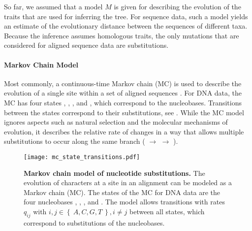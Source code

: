 So far, we assumed that a model $M$ is given for describing the evolution of the traits that are used for inferring the tree.
For sequence data, such a model yields an estimate of the evolutionary distance between the sequences of different taxa.
Because the inference assumes homologous traits,
the only mutations that are considered for aligned sequence data are substitutions.

\paragraph{Markov Chain Model}
\label{ch:Foundations:sec:MLTreeInference:sub:ModelsOfSeqEvol:par:MCModel}

Most commonly, a continuous-time Markov chain (MC) is used to describe
the evolution of a single site within a set of aligned sequences \cite{Gagniuc2017}.
For DNA data, the MC has four states , , , and ,
which correspond to the nucleobases.
Transitions between the states correspond to their substitutions, see .
While the MC model ignores aspects such as natural selection and the molecular mechanisms of evolution,
it describes the relative rate of changes in a way that allows multiple substitutions to occur
along the same branch ( $\rightarrow$  $\rightarrow$ ).

\begin{figure}[hpbt]
    \centering
    \texttt{[image: mc\_state\_transitions.pdf]}
    \caption[Markov chain model of nucleotide substitutions]{
        \textbf{Markov chain model of nucleotide substitutions.}
        The evolution of characters at a site in an alignment can be modeled as a Markov chain (MC).
        The states of the MC for DNA data are the four nucleobases
        , , , and .
        The model allows transitions with rates $q_{ij}$ with $i,j \in \left\{~ A, C, G, T ~\right\}, i \neq j$ between all states,
        which correspond to substitutions of the nucleobases.
    }
    \label{fig:mc_state_transitions}
\end{figure}

